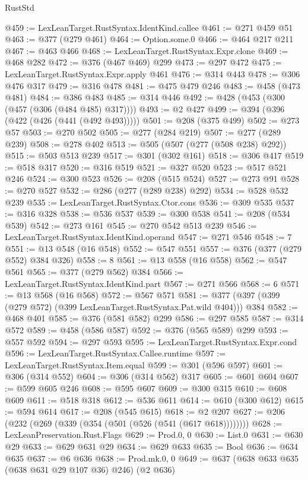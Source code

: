 \begin{lexlean}{RustStd}
\begin{coremodule}
@459 := LexLeanTarget.RustSyntax.IdentKind.callee
@461 := @271 @459 @51
@463 := @377 (@279 @461)
@464 := Option.some.{0}
@466 := @464 @217 @211
@467 := @463 @466
@468 := LexLeanTarget.RustSyntax.Expr.clone
@469 := @468 @282
@472 := @376 (@467 @469) @299
@473 := @297 @472
@475 := LexLeanTarget.RustSyntax.Expr.apply @461
@476 := @314 @443
@478 := @306 @476 @317
@479 := @316 @478
@481 := @475 @479 @246
@483 := @458 (@473 @481)
@484 := @386 @483
@485 := @314 @446
@492 := @428 (@453 (@300 (@457 (@306 (@484 @485) @317))))
@493 := @2 @427
@499 := @394 (@396 (@422 (@426 (@441 (@492 @493)))))
@501 := @208 (@375 @499)
@502 := @273 @57
@503 := @270 @502
@505 := @277 (@284 @219)
@507 := @277 (@289 @239)
@508 := @278 @402
@513 := @505 (@507 (@277 (@508 @238) @292))
@515 := @503 @513 @239
@517 := @301 (@302 @161)
@518 := @306 @417
@519 := @518 @317
@520 := @316 @519
@521 := @327 @520
@523 := @517 @521 @246
@524 := @300 @523
@526 := @208 (@515 @524)
@527 := @273 @91
@528 := @270 @527
@532 := @286 (@277 (@289 @238) @292)
@534 := @528 @532 @239
@535 := LexLeanTarget.RustSyntax.Ctor.cons
@536 := @309 @535
@537 := @316 @328
@538 := @536 @537
@539 := @300 @538
@541 := @208 (@534 @539)
@542 := @273 @161
@545 := @270 @542 @513 @239
@546 := LexLeanTarget.RustSyntax.IdentKind.operand
@547 := @271 @546
@548 := 7
@551 := @13 @548 (@16 @548)
@552 := @547 @551
@557 := @376 (@377 (@279 @552) @384 @326)
@558 := 8
@561 := @13 @558 (@16 @558)
@562 := @547 @561
@565 := @377 (@279 @562) @384
@566 := LexLeanTarget.RustSyntax.IdentKind.part
@567 := @271 @566
@568 := 6
@571 := @13 @568 (@16 @568)
@572 := @567 @571
@581 := @377 (@397 (@399 (@279 @572) (@399 LexLeanTarget.RustSyntax.Pat.wild @404))) @384
@582 := @468 @401
@585 := @376 (@581 @582) @299
@586 := @297 @585
@587 := @314 @572
@589 := @458 (@586 @587)
@592 := @376 (@565 @589) @299
@593 := @557 @592
@594 := @297 @593
@595 := LexLeanTarget.RustSyntax.Expr.cond
@596 := LexLeanTarget.RustSyntax.Callee.runtime
@597 := LexLeanTarget.RustSyntax.Item.equal
@599 := @301 (@596 @597)
@601 := @306 (@314 @552)
@604 := @306 (@314 @562) @317
@605 := @601 @604
@607 := @599 @605 @246
@608 := @595 @607
@609 := @300 @315
@610 := @608 @609
@611 := @518 @318
@612 := @536 @611
@614 := @610 (@300 @612)
@615 := @594 @614
@617 := @208 (@545 @615)
@618 := @2 @207
@627 := @206 (@232 (@269 (@339 (@354 (@501 (@526 (@541 (@617 @618))))))))
@628 := LexLeanPreservation.Rust.Flags
@629 := Prod.{0, 0}
@630 := List.{0}
@631 := @630 @29
@633 := @629 @631 @29
@634 := @629 @633
@635 := Bool
@636 := @634 @635
@637 := @6 @636
@638 := Prod.mk.{0, 0}
@649 := @637 (@638 @633 @635 (@638 @631 @29 @107 @36) @246) (@2 @636)

\end{coremodule}
\end{lexlean}
